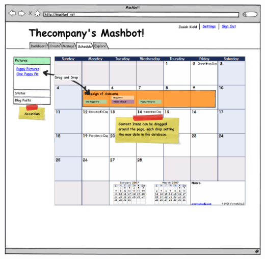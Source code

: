 \documentclass{report}
\begin{document}
\begin{itemize}
  \includegraphics[width=\textwidth]{../mockups/schedule-content.png}
\end{itemize}
\end{document}
